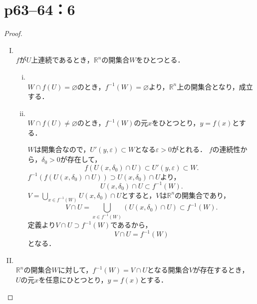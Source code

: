 \documentclass[a4paper,10pt,fleqn]{ltjsarticle}
\begin{document}
\newpage


\section*{p63--64：6}

\begin{leftbar}
    \begin{proof} \mbox{　}
        \begin{enumerate}[(I)]
            \item \mbox{} \\
                  $f$が$U$上連続であるとき，$\mathbb{R}^n$の開集合$W$をひとつとる．
                  \begin{enumerate}[(i)]
                      \item \mbox{} \\
                            $W \cap f(U) = \varnothing$のとき，$f^{-1} (W) = \varnothing$より，$\mathbb{R}^n$上の開集合となり，成立する．
                      \item \mbox{} \\
                            $W \cap f(U) \ne \varnothing$のとき，$f^{-1} (W)$の元$x$をひとつとり，$y=f(x)$とする．

                            $W$は開集合なので，$U'(y,\varepsilon) \subset W$となる$\varepsilon >0$がとれる．
                            $f$の連続性から，$\delta_0 >0$が存在して，
                            \[
                                f(U(x,\delta_0) \cap U) \subset U'(y,\varepsilon) \subset W.
                            \]
                            $f^{-1} (f(U(x,\delta_0) \cap U)) \supset U(x,\delta_0) \cap U$より，
                            \[
                                U(x,\delta_0) \cap U \subset f^{-1} (W).
                            \]
                            $V = \bigcup_{x \in f^{-1}(W)} U(x,\delta_0) \cap U$とすると，$V$は$\mathbb{R}^n$の開集合であり，
                            \[
                                V \cap U = \bigcup_{x \in f^{-1}(W)} (U(x,\delta_0) \cap U)  \subset f^{-1} (W).
                            \]
                            定義より$V \cap U \supset f^{-1} (W)$であるから，
                            \[
                                V \cap U = f^{-1} (W)
                            \]
                            となる．
                  \end{enumerate}
            \item \mbox{} \\
                  $\mathbb{R}^n$の開集合$W$に対して，$f^{-1}(W)=V \cap U$となる開集合$V$が存在するとき，
                  $U$の元$x$を任意にひとつとり，$y=f(x)$とする．


\end{enumerate}
\end{proof}
\end{leftbar}
\end{document}
